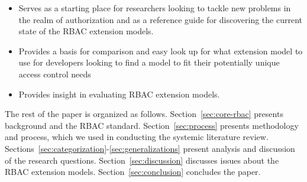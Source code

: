 \begin{itemize}
\setlength{\itemsep}{0.25pt}
\item Serves as a starting place for researchers looking to tackle new problems in the realm of authorization and as a reference guide for discovering
the current state of the RBAC extension models. 
\item Provides a basis for comparison and easy look up for what extension model to use for developers looking to find a model to fit their potentially unique access control needs
\item Provides insight in evaluating RBAC extension models.
\end{itemize}

The rest of the paper is organized as follows. 
Section~\ref{sec:core-rbac} presents background and the RBAC standard. 
Section~\ref{sec:process} presents methodology and process, which we used in conducting the systemic literature review. 
Sections~\ref{sec:categorization}-\ref{sec:generalizations} present analysis and discussion of the research questions. 
Section~\ref{sec:discussion} discusses issues about the RBAC extension models.
Section~\ref{sec:conclusion} concludes the paper.
